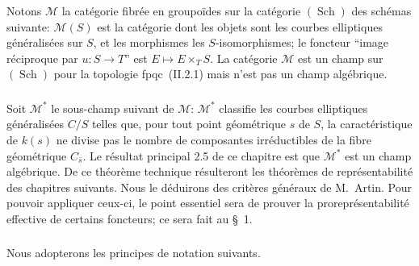 \documentclass[11pt,a4paper]{amsart}
\theoremstyle{plain}
\theoremstyle{definition}
\DeclareMathOperator{\Sch}{Sch}
\newcommand{\mll}{\mathcal{M}}
\newcommand{\fpqc}{\textup{fpqc}}
\begin{document}
\subsubsection{}
Notons $\mll$ la cat\'egorie fibr\'ee en groupo\"ides sur la cat\'egorie $(\Sch)$ des sch\'emas suivante: $\mll(S)$ est la cat\'egorie dont les objets sont les courbes elliptiques g\'en\'eralis\'ees sur $S$, et les morphismes les $S$-isomorphismes; le foncteur ``image r\'eciproque par $u \colon S \to T$'' est $E \mapsto E \times_T S$. La cat\'egorie $\mll$ est un champ sur $(\Sch)$ pour la topologie \fpqc\ (II.2.1) mais n'est pas un champ alg\'ebrique.

\subsubsection{}
Soit $\mll^*$ le sous-champ suivant de $\mll$: $\mll^*$ classifie les courbes elliptiques g\'en\'eralis\'ees $C/S$ telles que, pour tout point g\'eom\'etrique $s$ de $S$, la caract\'eristique de $k(s)$ ne divise pas le nombre de composantes irr\'eductibles de la fibre g\'eom\'etrique $C_{\bar{s}}$. Le r\'esultat principal 2.5 de ce chapitre est que $\mll^*$ est un champ alg\'ebrique. De ce th\'eor\`eme technique r\'esulteront les th\'eor\`emes de repr\'esentabilit\'e des chapitres suivants. Nous le d\'eduirons des crit\`eres g\'en\'eraux de M.~Artin. Pour pouvoir appliquer ceux-ci, le point essentiel sera de prouver la prorepr\'esentabilit\'e effective de certains foncteurs; ce sera fait au \S\ 1.

\subsubsection{}
Nous adopterons les principes de notation suivants.
\end{document}

